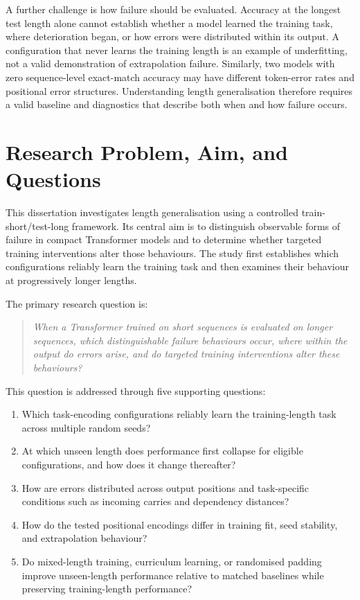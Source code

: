 \documentclass[
    author={Aanchala Ravindra Bhongade},
    supervisor={Dr. Fernando Moreno-Pino},
    degree={MSc},
    title={Length Generalisation in Transformer-Based Sequence Models: Failure Taxonomy and Mitigation Strategies},
    subtitle={},
    type={},
    year={2026}
]{dissertation}
\begin{document}
A further challenge is how failure should be evaluated. Accuracy at the longest test length alone cannot establish whether a model learned the training task, where deterioration began, or how errors were distributed within its output. A configuration that never learns the training length is an example of underfitting, not a valid demonstration of extrapolation failure. Similarly, two models with zero sequence-level exact-match accuracy may have different token-error rates and positional error structures. Understanding length generalisation therefore requires a valid baseline and diagnostics that describe both when and how failure occurs.

\section{Research Problem, Aim, and Questions}
\label{sec:research_questions}

This dissertation investigates length generalisation using a controlled train-short/test-long framework. Its central aim is to distinguish observable forms of failure in compact Transformer models and to determine whether targeted training interventions alter those behaviours. The study first establishes which configurations reliably learn the training task and then examines their behaviour at progressively longer lengths.

The primary research question is:

\begin{quote}
\itshape
When a Transformer trained on short sequences is evaluated on longer
sequences, which distinguishable failure behaviours occur, where within the output do errors arise, and do targeted training interventions alter these behaviours?
\end{quote}

This question is addressed through five supporting questions:
\begin{enumerate}
    \item Which task-encoding configurations reliably learn the
    training-length task across multiple random seeds?

    \item At which unseen length does performance first collapse for eligible configurations, and how does it change thereafter?

    \item How are errors distributed across output positions and
    task-specific conditions such as incoming carries and dependency
    distances?

    \item How do the tested positional encodings differ in training fit, seed stability, and extrapolation behaviour?

    \item Do mixed-length training, curriculum learning, or randomised padding improve unseen-length performance relative to matched baselines while preserving training-length performance?
\end{enumerate}
\end{document}
